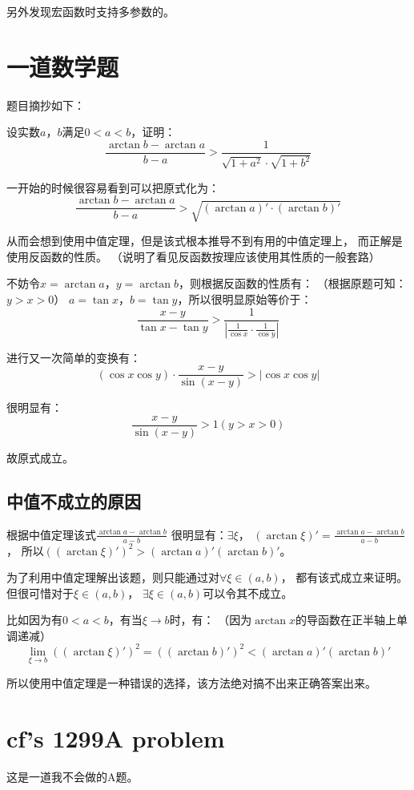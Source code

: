 另外发现宏函数时支持多参数的。


\section{一道数学题}

题目摘抄如下：

设实数$a$，$b$满足$0<a<b$，证明：
$$\frac{\arctan b-\arctan a}{b-a}
>\frac{1}{\sqrt{1+a^2}\cdot\sqrt{1+b^2}}$$

一开始的时候很容易看到可以把原式化为：
$$\frac{\arctan b-\arctan a}{b-a}>
\sqrt{(\arctan a)'\cdot(\arctan b)'}$$

从而会想到使用中值定理，但是该式根本推导不到有用的中值定理上，
而正解是使用反函数的性质。
（说明了看见反函数按理应该使用其性质的一般套路）

不妨令$x=\arctan a$，$y=\arctan b$，则根据反函数的性质有：
（根据原题可知：$y>x>0$）
$a=\tan x$，$b=\tan y$，所以很明显原始等价于：
$$\frac{x-y}{\tan x-\tan y}>
\frac{1}{|\frac{1}{\cos x}\cdot\frac{1}{\cos y}|}$$

进行又一次简单的变换有：
$$(\cos x\cos y)\cdot\frac{x-y}{\sin(x-y)}>|\cos x\cos y|$$

很明显有：
$$\frac{x-y}{\sin(x-y)}>1(y>x>0)$$

故原式成立。

\subsection{中值不成立的原因}
根据中值定理该式$\frac{\arctan a-\arctan b}{a-b}$
很明显有：$\exists \xi$，
$(\arctan\xi)'=\frac{\arctan a-\arctan b}{a-b}$，
所以$((\arctan\xi)')^2>(\arctan a)'(\arctan b)'$。

为了利用中值定理解出该题，则只能通过对$\forall\xi\in(a, b)$，
都有该式成立来证明。但很可惜对于$\xi\in(a, b)$，
$\exists\xi\in(a, b)$可以令其不成立。

比如因为有$0<a<b$，有当$\xi\to b$时，有：
（因为$\arctan x$的导函数在正半轴上单调递减）
$$\lim_{\xi\to b}((\arctan\xi)')^2=
((\arctan b)')^2<
(\arctan a)'(\arctan b)'$$

所以使用中值定理是一种错误的选择，该方法绝对搞不出来正确答案出来。


\section{cf's 1299A problem}

这是一道我不会做的A题。

